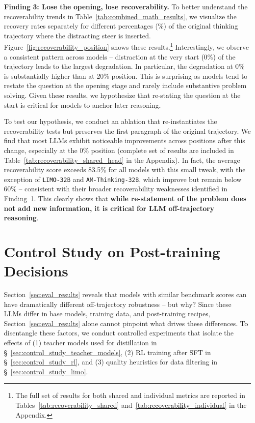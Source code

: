 \documentclass{article} %
\begin{document}
\textbf{Finding 3: Lose the opening, lose recoverability.} To better understand the recoverability trends in Table~\ref{tab:combined_math_results},
we visualize the recovery rates separately for different percentages ($\%$) of the original thinking trajectory where the distracting steer is inserted. Figure~\ref{fig:recoverability_position} shows these results.\footnote{The full set of results for both shared and individual metrics are reported in Tables~\ref{tab:recoverability_shared} and~\ref{tab:recoverability_individual} in the Appendix.} Interestingly, we observe a consistent pattern across models -- distraction at the very start (0\%) of the trajectory leads to the largest degradation. In particular, the degradation at 0\% is substantially higher than at 20\% position. This is surprising as models tend to restate the question at the opening stage and rarely include substantive problem solving. Given these results, we hypothesize that re-stating the question at the start is critical for models to anchor later reasoning.

To test our hypothesis, we conduct an ablation that re-instantiates the recoverability tests but preserves the first paragraph of the original trajectory. We find that most LLMs exhibit noticeable improvements across positions after this change, especially at the 0\% position (complete set of results are included in Table~\ref{tab:recoverability_shared_head} in the Appendix). In fact, the average recoverability score exceeds 83.5\% for all models with this small tweak, with the exception of \texttt{LIMO-32B} and \texttt{AM-Thinking-32B}, which improve but remain below 60\% -- consistent with their broader recoverability weaknesses identified in Finding~1. This clearly shows that \textbf{while re-statement of the problem does not add new information, it is critical for LLM off-trajectory reasoning}.

\section{Control Study on Post-training Decisions}
\label{sec:control_study}

Section~\ref{sec:eval_results} reveals that models with similar benchmark scores can have dramatically different off-trajectory robustness -- but why? Since these LLMs differ in base models, training data, and post-training recipes, Section~\ref{sec:eval_results} alone cannot pinpoint what drives these differences. To disentangle these factors, we conduct controlled experiments that isolate the effects of (1) teacher models used for distillation in \S~\ref{sec:control_study_teacher_models}, (2) RL training after SFT in \S~\ref{sec:control_study_rl}, and (3) quality heuristics for data filtering in \S~\ref{sec:control_study_limo}.
\end{document}
